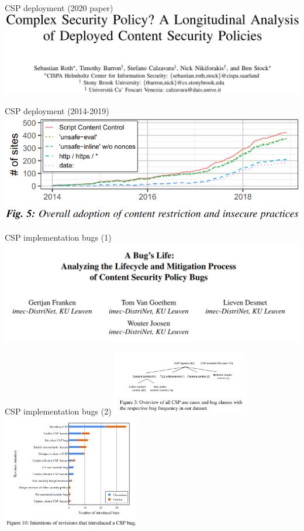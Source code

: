 \begin{frame}{CSP deployment (2020 paper)}
\includegraphics[width=\textwidth]{../web/roth-ndss-title}
\end{frame}

\begin{frame}{CSP deployment (2014-2019)}
\includegraphics[width=\textwidth]{../web/roth-ndss-fig5}
\end{frame}


\begin{frame}{CSP implementation bugs (1)}
\includegraphics[width=\textwidth]{../web/franken-title}
\end{frame}

\begin{frame}{CSP implementation bugs (2)}
\includegraphics[width=0.45\textwidth]{../web/franken-fig3}
\includegraphics[width=0.45\textwidth]{../web/franken-fig10}
\end{frame}



